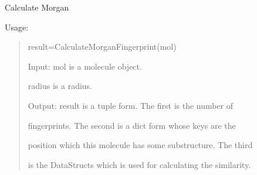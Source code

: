 \documentclass[letterpaper,10pt,english]{sphinxmanual}
\begin{document}

\begin{fulllineitems}
\label{reference/fingerprint:fingerprint.CalculateMorganFingerprint}
Calculate Morgan

Usage:
\begin{quote}

result=CalculateMorganFingerprint(mol)

Input: mol is a molecule object.

radius is a radius.

Output: result is a tuple form. The first is the number of

fingerprints. The second is a dict form whose keys are the

position which this molecule has some substructure. The third

is the DataStructs which is used for calculating the similarity.
\end{quote}

\end{fulllineitems}


\begin{fulllineitems}
\label{reference/fingerprint:fingerprint.CalculatePharm2D2pointFingerprint}
\end{fulllineitems}


\begin{fulllineitems}
\label{reference/fingerprint:fingerprint.CalculatePharm2D3pointFingerprint}
\end{fulllineitems}

\end{document}
